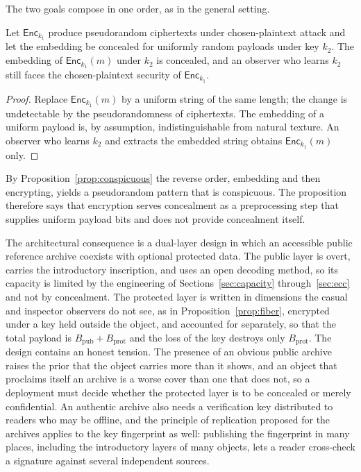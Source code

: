 The two goals compose in one order, as in the general setting.

\begin{proposition}\label{prop:compose}
Let $\mathsf{Enc}_{k_1}$ produce pseudorandom ciphertexts under chosen-plaintext attack and let the embedding be concealed for uniformly random payloads under key $k_2$. The embedding of $\mathsf{Enc}_{k_1}(m)$ under $k_2$ is concealed, and an observer who learns $k_2$ still faces the chosen-plaintext security of $\mathsf{Enc}_{k_1}$.
\end{proposition}

\begin{proof}
Replace $\mathsf{Enc}_{k_1}(m)$ by a uniform string of the same length; the change is undetectable by the pseudorandomness of ciphertexts. The embedding of a uniform payload is, by assumption, indistinguishable from natural texture. An observer who learns $k_2$ and extracts the embedded string obtains $\mathsf{Enc}_{k_1}(m)$ only.
\end{proof}

By Proposition~\ref{prop:conspicuous} the reverse order, embedding and then encrypting, yields a pseudorandom pattern that is conspicuous. The proposition therefore says that encryption serves concealment as a preprocessing step that supplies uniform payload bits and does not provide concealment itself.

The architectural consequence is a dual-layer design in which an accessible public reference archive coexists with optional protected data. The public layer is overt, carries the introductory inscription, and uses an open decoding method, so its capacity is limited by the engineering of Sections~\ref{sec:capacity} through~\ref{sec:ecc} and not by concealment. The protected layer is written in dimensions the casual and inspector observers do not see, as in Proposition~\ref{prop:fiber}, encrypted under a key held outside the object, and accounted for separately, so that the total payload is $B_{\mathrm{pub}}+B_{\mathrm{prot}}$ and the loss of the key destroys only $B_{\mathrm{prot}}$. The design contains an honest tension. The presence of an obvious public archive raises the prior that the object carries more than it shows, and an object that proclaims itself an archive is a worse cover than one that does not, so a deployment must decide whether the protected layer is to be concealed or merely confidential. An authentic archive also needs a verification key distributed to readers who may be offline, and the principle of replication proposed for the archives applies to the key fingerprint as well: publishing the fingerprint in many places, including the introductory layers of many objects, lets a reader cross-check a signature against several independent sources.

